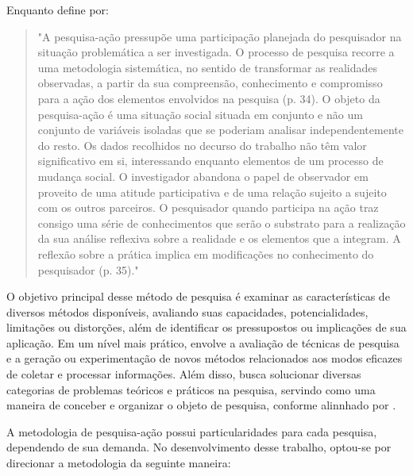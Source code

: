 Enquanto \cite{da2002apostila} define por:

\begin{quotation}
\begin{adjustwidth}{4cm}{-1cm}
"A pesquisa-ação pressupõe uma participação planejada do pesquisador na situação problemática a ser investigada. O processo de pesquisa 
recorre a uma metodologia sistemática, no sentido de transformar as realidades observadas, a partir da sua compreensão, conhecimento e 
compromisso para a ação dos elementos envolvidos na pesquisa (p. 34). O objeto da pesquisa-ação é uma situação social situada em conjunto 
e não um conjunto de variáveis isoladas que se poderiam analisar independentemente do resto. Os dados recolhidos no decurso do trabalho 
não têm valor significativo em si, interessando enquanto elementos de um processo de mudança social. O investigador abandona o papel 
de observador em proveito de uma atitude participativa e de uma relação sujeito a sujeito com os outros parceiros. O pesquisador quando 
participa na ação traz consigo uma série de conhecimentos que serão o substrato para a realização da sua análise reflexiva sobre a 
realidade e os elementos que a integram. A reflexão sobre a prática implica em modificações no conhecimento do pesquisador (p. 35)."
\end{adjustwidth}
\end{quotation}

O objetivo principal desse método de pesquisa é examinar as características de diversos métodos disponíveis, avaliando suas capacidades, 
potencialidades, limitações ou distorções, além de identificar os pressupostos ou implicações de sua aplicação. Em um nível mais prático, 
envolve a avaliação de técnicas de pesquisa e a geração ou experimentação de novos métodos relacionados aos modos eficazes de coletar e 
processar informações. Além disso, busca solucionar diversas categorias de problemas teóricos e práticos na pesquisa, servindo como uma 
maneira de conceber e organizar o objeto de pesquisa, conforme alinnhado por \cite{thiollent1988metodologia}.

A metodologia de pesquisa-ação possui particularidades para cada pesquisa, dependendo de sua demanda. No desenvolvimento 
desse trabalho, optou-se por direcionar a metodologia da seguinte maneira:

